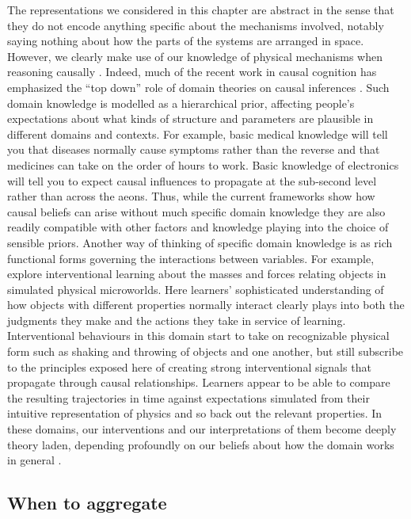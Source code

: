 \documentclass{cambridge7A}%
\begin{document}
The representations we considered in this chapter are abstract in the sense that they do not encode anything specific about the mechanisms involved, notably saying nothing about how the parts of the systems are arranged in space.  However, we clearly make use of our knowledge of physical mechanisms when reasoning causally \citep{ahn1995role,bramley2018physics}.  Indeed, much of the recent work in causal cognition has emphasized the ``top down'' role of domain theories on causal inferences \citep{griffiths2009theory,griffiths2005causes,lake2015human}.  Such domain knowledge is modelled as a hierarchical prior, affecting people's expectations about what kinds of structure and parameters are plausible in different domains and contexts.  For example, basic medical knowledge will tell you that diseases normally cause symptoms rather than the reverse and that medicines can take on the order of hours to work.  Basic knowledge of electronics will tell you to expect causal influences to propagate at the sub-second level rather than across the aeons.  Thus, while the current frameworks show how causal beliefs can arise without much specific domain knowledge they are also readily compatible with other factors and knowledge playing into the choice of sensible priors.  Another way of thinking of specific domain knowledge is as rich functional forms governing the interactions between variables.  For example, \cite{bramley2018physics} explore interventional learning about the masses and forces relating objects in simulated physical microworlds.  Here learners' sophisticated understanding of how objects with different properties normally interact clearly plays into both the judgments they make and the actions they take in service of learning.  Interventional behaviours in this domain start to take on recognizable physical form such as shaking and throwing of objects and one another, but still subscribe to the principles exposed here of creating strong interventional signals that propagate through causal relationships.  Learners appear to be able to compare the resulting trajectories in time against expectations simulated from their intuitive representation of physics and so back out the relevant properties.  In these domains, our interventions and our interpretations of them become deeply theory laden, depending profoundly on our beliefs about how the domain works in general \citep{bramley2017neurath}.

\subsection{When to aggregate}
    
\end{document}
